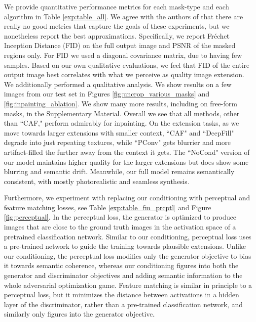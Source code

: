 We provide quantitative performance metrics for each mask-type and each algorithm in Table \ref{exp:table_all}. We agree with the authors of \cite{yu2018generative, liu2018partialinpainting} that there are really no good metrics that capture the goals of these experiments, but we nonetheless report the best approximations. Specifically, we report Fr\'echet Inception Distance (FID) \cite{heusel2017gans} on the full output image and PSNR of the masked regions only. For FID we used a diagonal covariance matrix, due to having few samples. Based on our own qualitative evaluations, we feel that FID of the entire output image best correlates with what we perceive as quality image extension. We additionally performed a qualitative analysis. We show results on a few images from our test set in Figures \ref{fig:uncrop_various_masks} and \ref{fig:inpainting_ablation}. We show many more results, including on free-form masks, in the Supplementary Material. Overall we see that all methods, other than ``CAF," perform admirably for inpainting. On the extension tasks, as we move towards larger extensions with smaller context, ``CAF" and ``DeepFill" degrade into just repeating textures, while ``PConv" gets blurrier and more artifact-filled the further away from the context it gets. The ``NoCond" version of our model maintains higher quality for the larger extensions but does show some blurring and semantic drift. Meanwhile, our full model remains semantically consistent, with mostly photorealistic and seamless synthesis.

Furthermore, we experiment with replacing our conditioning with perceptual \cite{johnson2016perceptual} and feature matching \cite{wang2018pix2pixHD} losses, see Table \ref{exp:table_fm_prcptl} and Figure \ref{fig:perceptual}. In the perceptual loss, the generator is optimized to produce images that are close to the ground truth images in the activation space of a pretrained classification network. Similar to our conditioning, perceptual loss uses a pre-trained network to guide the training towards plausible extensions. Unlike our conditioning, the perceptual loss  modifies  only the generator objective to bias it towards semantic coherence, whereas our conditioning figures into both the generator and discriminator objectives and adding semantic information to the whole adversarial optimization game. 
Feature matching is similar in principle to a perceptual loss, but it minimizes the distance between activations in a hidden layer of the discriminator, rather than a pre-trained classification network, and similarly only figures into the generator objective.

